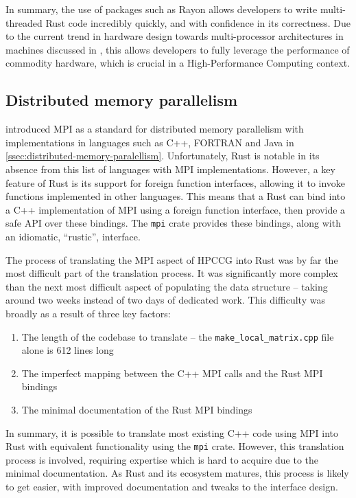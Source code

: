 In summary, the use of packages such as Rayon allows developers to write multi-threaded Rust code incredibly quickly, and with confidence in its correctness. Due to the current trend in hardware design towards multi-processor architectures in machines discussed in , this allows developers to fully leverage the performance of commodity hardware, which is crucial in a High-Performance Computing context.

\subsection{Distributed memory parallelism}
\label{sec:translation-mpi}

 introduced MPI as a standard for distributed memory parallelism with implementations in languages such as C++, FORTRAN and Java in \ref{ssec:distributed-memory-paralellism}. Unfortunately, Rust is notable in its absence from this list of languages with MPI implementations. However, a key feature of Rust is its support for foreign function interfaces, allowing it to invoke functions implemented in other languages. This means that a Rust can bind into a C++ implementation of MPI using a foreign function interface, then provide a safe API over these bindings. The \texttt{mpi} crate \cite{RsmpiRsmpi2024} provides these bindings, along with an idiomatic, ``rustic'', interface.

The process of translating the MPI aspect of HPCCG into Rust was by far the most difficult part of the translation process. It was significantly more complex than the next most difficult aspect of populating the data structure -- taking around two weeks instead of two days of dedicated work. This difficulty was broadly as a result of three key factors:

\begin{enumerate}
    \item The length of the codebase to translate -- the \texttt{make\_local\_matrix.cpp} file alone is 612 lines long
    \item The imperfect mapping between the C++ MPI calls and the Rust MPI bindings
    \item The minimal documentation of the Rust MPI bindings
\end{enumerate}


In summary, it is possible to translate most existing C++ code using MPI into Rust with equivalent functionality using the \texttt{mpi} crate. However, this translation process is involved, requiring expertise which is hard to acquire due to the minimal documentation. As Rust and its ecosystem matures, this process is likely to get easier, with improved documentation and tweaks to the interface design.

